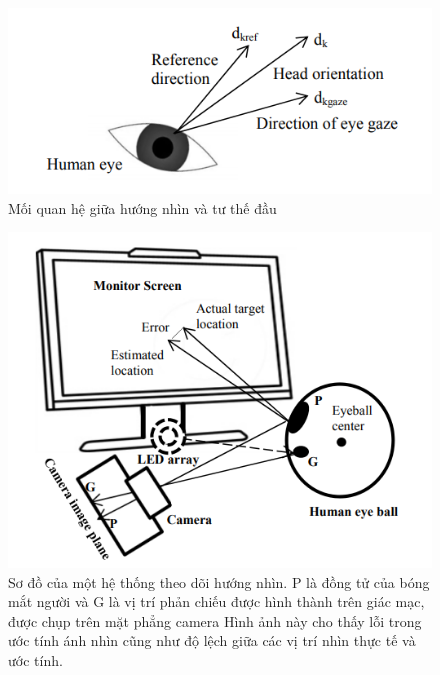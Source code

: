 \clearpage 

\begin{center}
    \begin{figure}[h!]
    \begin{center}
     \includegraphics[scale=0.5]{img/Relation_between_gaze_direction_head_pose.png}
    \end{center}
    \caption{Mối quan hệ giữa hướng nhìn và tư thế đầu \cite{AReviewandAnalysisofEyeGazeEstimation}}
    \label{refhinh15}
    \end{figure}
\end{center}

\begin{center}
    \begin{figure}[h!]
    \begin{center}
     \includegraphics[scale=0.5]{img/Schematic_diagram_of_a_typical_gaze_tracking_system.png}
    \end{center}
    \caption{Sơ đồ của một hệ thống theo dõi hướng nhìn. P là đồng tử của bóng mắt người và G là vị trí phản chiếu được hình thành trên giác mạc, được chụp trên mặt phẳng camera Hình ảnh này cho thấy lỗi trong ước tính ánh nhìn cũng như độ lệch giữa các vị trí nhìn thực tế và ước tính. \cite{AReviewandAnalysisofEyeGazeEstimation}}
    \label{refhinh15}
    \end{figure}
\end{center}

